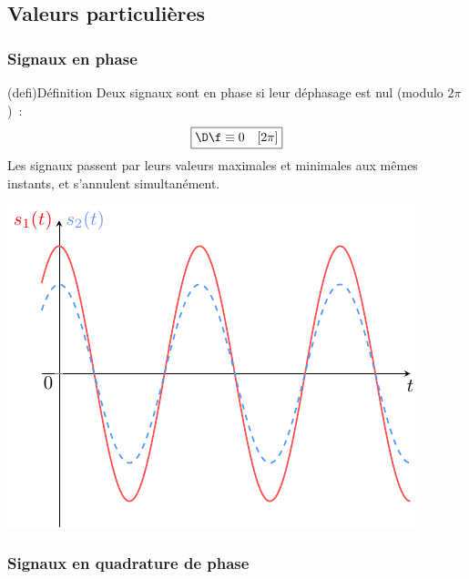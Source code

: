 \documentclass[../../main/main.tex]{subfiles}
\begin{document}
\vspace{-20pt}
\subsection{Valeurs particulières}
\subsubsection{Signaux en phase}
\vspace{-20pt}
\begin{minipage}{0.70\linewidth}
	\begin{tcb}(defi){\small Définition}
		Deux signaux sont en phase si leur déphasage est nul (modulo $2\pi$)~:
		\[\boxed{\D\f \equiv 0\quad[2\pi]}\]
		Les signaux passent par leurs valeurs maximales et minimales aux mêmes
		instants, et s'annulent simultanément.
	\end{tcb}
\end{minipage}
\hfill
\begin{minipage}{0.30\linewidth}
	\begin{center}
		\includegraphics[width=\linewidth]{dfeq0.pdf}
	\end{center}
\end{minipage}

\vspace{-20pt}
\subsubsection{Signaux en quadrature de phase}
\end{document}

